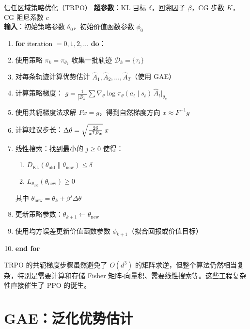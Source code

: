 \begin{myalgorithm}{信任区域策略优化（TRPO）}
\textbf{超参数}：KL 目标 $\delta$，回溯因子 $\beta$，CG 步数 $K$，CG 阻尼系数 $c$\\
\textbf{输入}：初始策略参数 $\theta_0$，初始价值函数参数 $\phi_0$
\begin{enumerate}
    \item \textbf{for} iteration $= 0, 1, 2, \dots$ \textbf{do}：
    \item \quad 使用策略 $\pi_k = \pi_{\theta_k}$ 收集一批轨迹 $\mathcal{D}_k = \{\tau_i\}$
    \item \quad 对每条轨迹计算优势估计 $\hat{A}_1, \hat{A}_2, \dots, \hat{A}_T$（使用 GAE）
    \item \quad 计算策略梯度：
    \quad $g = \frac{1}{|\mathcal{D}_k|} \sum \nabla_\theta \log \pi_\theta(a_t \mid s_t) \, \hat{A}_t \big|_{\theta_k}$
    \item \quad 使用共轭梯度法求解 $F x = g$，得到自然梯度方向 $x \approx F^{-1} g$
    \item \quad 计算建议步长：$\Delta\theta = \sqrt{\frac{2\delta}{x^{\mathsf{T}} F x}} \; x$
    \item \quad 线性搜索：找到最小的 $j \ge 0$ 使得：
    \begin{enumerate}
        \item $\overline{D}_{\text{KL}}(\theta_{\text{old}} \| \theta_{\text{new}}) \le \delta$
        \item $L_{\theta_{\text{old}}}(\theta_{\text{new}}) \ge 0$
    \end{enumerate}
    其中 $\theta_{\text{new}} = \theta_k + \beta^j \Delta\theta$
    \item \quad 更新策略参数：$\theta_{k+1} \leftarrow \theta_{\text{new}}$
    \item \quad 使用均方误差更新价值函数参数 $\phi_{k+1}$（拟合回报或价值目标）
    \item \textbf{end for}
\end{enumerate}
\end{myalgorithm}

\begin{remark}
TRPO 的共轭梯度步骤虽然避免了 $O(d^3)$ 的矩阵求逆，但整个算法仍然相当复杂，特别是需要计算和存储 Fisher 矩阵-向量积、需要线性搜索等。这些工程复杂性直接催生了 PPO 的诞生。
\end{remark}

\section{GAE：泛化优势估计}

